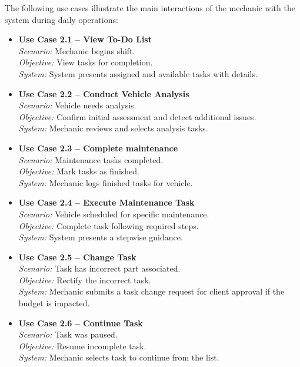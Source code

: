 The following use cases illustrate the main interactions of the mechanic with the system during daily operations:

\begin{itemize}
    \item \textbf{Use Case 2.1 – View To-Do List}\\
    \textit{Scenario:} Mechanic begins shift.\\
    \textit{Objective:} View tasks for completion.\\
    \textit{System:} System presents assigned and available tasks with details.
    \item \textbf{Use Case 2.2 – Conduct Vehicle Analysis}\\
    \textit{Scenario:} Vehicle needs analysis.\\
    \textit{Objective:} Confirm initial assessment and detect additional issues.\\
    \textit{System:} Mechanic reviews and selects analysis tasks.
    \item \textbf{Use Case 2.3 – Complete maintenance}\\
    \textit{Scenario:} Maintenance tasks completed.\\
    \textit{Objective:} Mark tasks as finished.\\
    \textit{System:} Mechanic logs finished tasks for vehicle.
    \item \textbf{Use Case 2.4 – Execute Maintenance Task}\\
    \textit{Scenario:} Vehicle scheduled for specific maintenance.\\
    \textit{Objective:} Complete task following required steps.\\
    \textit{System:} System presents a stepwise guidance.
    \item \textbf{Use Case 2.5 – Change Task}\\
    \textit{Scenario:} Task has incorrect part associated.\\
    \textit{Objective:} Rectify the incorrect task.\\
    \textit{System:} Mechanic submits a task change request for client approval if the budget is impacted.
    \item \textbf{Use Case 2.6 – Continue Task}\\
    \textit{Scenario:} Task was paused.\\
    \textit{Objective:} Resume incomplete task.\\
    \textit{System:} Mechanic selects task to continue from the list.
\end{itemize}


